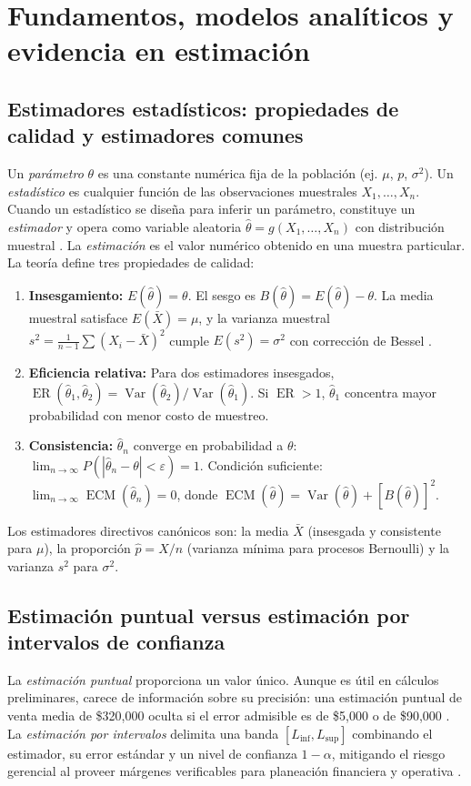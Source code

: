 \section{Fundamentos, modelos analíticos y evidencia en estimación}
\subsection{Estimadores estadísticos: propiedades de calidad y estimadores comunes}
Un \textit{parámetro} $\theta$ es una constante numérica fija de la población (ej. $\mu$, $p$, $\sigma^2$). Un \textit{estadístico} es cualquier función de las observaciones muestrales $X_1, \dots, X_n$. Cuando un estadístico se diseña para inferir un parámetro, constituye un \textit{estimador} y opera como variable aleatoria $\hat{\theta} = g(X_1, \dots, X_n)$ con distribución muestral \citep{wackerly2010}. La \textit{estimación} es el valor numérico obtenido en una muestra particular. La teoría define tres propiedades de calidad:
\begin{enumerate}\setlength{\itemsep}{0.5pt}\setlength{\parsep}{0pt}\setlength{\topsep}{0.5pt}
  \item \textbf{Insesgamiento:} $E(\hat{\theta}) = \theta$. El sesgo es $B(\hat{\theta}) = E(\hat{\theta}) - \theta$. La media muestral satisface $E(\bar{X}) = \mu$, y la varianza muestral $s^2 = \frac{1}{n-1}\sum (X_i - \bar{X})^2$ cumple $E(s^2) = \sigma^2$ con corrección de Bessel \citep{wackerly2010}.
  \item \textbf{Eficiencia relativa:} Para dos estimadores insesgados, $\operatorname{ER}(\hat{\theta}_1, \hat{\theta}_2) = \operatorname{Var}(\hat{\theta}_2)/\operatorname{Var}(\hat{\theta}_1)$. Si $\operatorname{ER} > 1$, $\hat{\theta}_1$ concentra mayor probabilidad con menor costo de muestreo.
  \item \textbf{Consistencia:} $\hat{\theta}_n$ converge en probabilidad a $\theta$: $\lim_{n \to \infty} P(|\hat{\theta}_n - \theta| < \varepsilon) = 1$. Condición suficiente: $\lim_{n\to\infty} \operatorname{ECM}(\hat{\theta}_n) = 0$, donde $\operatorname{ECM}(\hat{\theta}) = \operatorname{Var}(\hat{\theta}) + [B(\hat{\theta})]^2$.
\end{enumerate}
Los estimadores directivos canónicos son: la media $\bar{X}$ (insesgada y consistente para $\mu$), la proporción $\hat{p} = X/n$ (varianza mínima para procesos Bernoulli) y la varianza $s^2$ para $\sigma^2$.

\subsection{Estimación puntual versus estimación por intervalos de confianza}
La \textit{estimación puntual} proporciona un valor único. Aunque es útil en cálculos preliminares, carece de información sobre su precisión: una estimación puntual de venta media de \$320,000 oculta si el error admisible es de \$5,000 o de \$90,000 \citep{holmesBusiness2023}. La \textit{estimación por intervalos} delimita una banda $[L_{\text{inf}}, L_{\text{sup}}]$ combinando el estimador, su error estándar y un nivel de confianza $1-\alpha$, mitigando el riesgo gerencial al proveer márgenes verificables para planeación financiera y operativa \citep{anderson2012}.

